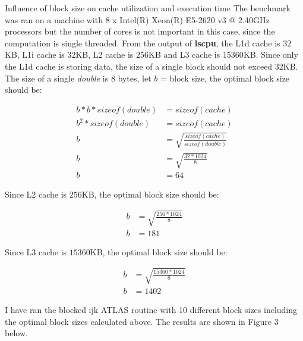 \documentclass[12pt]{article}
\begin{document}
\begin{section}{Influence of block size on cache utilization and execution time}
 The benchmark was ran on a machine with 8 x Intel(R) Xeon(R) E5-2620 v3 @ 2.40GHz processors but the number of cores is not important in this case,
 since the computation is single threaded. From the output of \textbf{lscpu}, the L1d cache is $32$KB, L1i cache is $32$KB, L2 cache is $256$KB
 and L3 cache is $15360$KB. Since only the L1d cache is storing data, the size of a single block should not exceed $32$KB. The size of a single
 \textit{double} is $8$ bytes, let $b$ = block size, the optimal block size should be:

 \begin{align*}
     b * b * sizeof(double) & = sizeof(cache)                               \\
     b^2 * sizeof(double)   & = sizeof(cache)                               \\
     b                      & = \sqrt{\frac{sizeof(cache)}{sizeof(double)}} \\
     b                      & = \sqrt{\frac{32 * 1024}{8}}                  \\
     b                      & = 64
 \end{align*}

 Since L2 cache is $256$KB, the optimal block size should be:

 \begin{align*}
     b & = \sqrt{\frac{256 * 1024}{8}} \\
     b & = 181
 \end{align*}

 Since L3 cache is $15360$KB, the optimal block size should be:

 \begin{align*}
     b & = \sqrt{\frac{15360 * 1024}{8}} \\
     b & = 1402
 \end{align*}

 I have ran the blocked ijk ATLAS routine with 10 different block sizes including the optimal block sizes calculated above. The results
 are shown in Figure 3 below.


\end{section}
\end{document}
